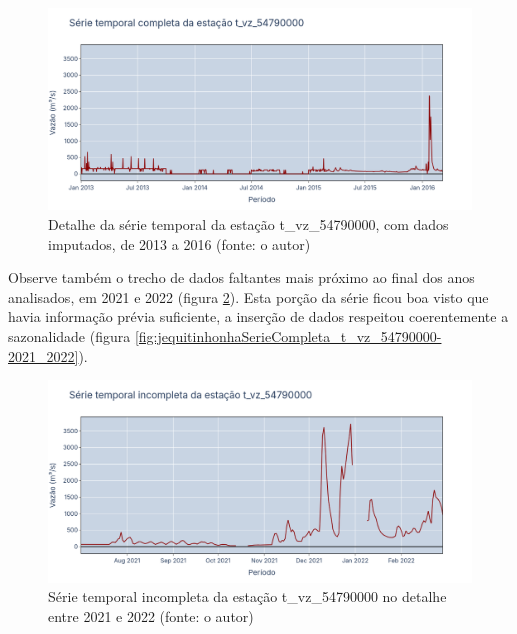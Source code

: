 \begin{figure}[!h]
	\centering
	\includegraphics[scale=0.25]{Figuras/jequiti/jequitinhonhaSerieCompleta_t_vz_54790000-2013_2016.png}
	\caption{Detalhe da série temporal da estação t\_vz\_54790000, com dados imputados, de 2013 a 2016 (fonte: o autor)}
	\label{fig:jequitinhonhaSerieCompleta_t_vz_54790000-2013_2016}
\end{figure}

Observe também o trecho de dados faltantes mais próximo ao final dos anos analisados, em 2021 e 2022 (figura \ref{fig:jequitinhonhaSerieIncompleta_t_vz_54790000-2021_2022}). Esta porção da série ficou boa visto que havia informação prévia suficiente, a inserção de dados respeitou coerentemente a sazonalidade (figura \ref{fig:jequitinhonhaSerieCompleta_t_vz_54790000-2021_2022}).

\begin{figure}[!h]
	\centering
	\includegraphics[scale=0.25]{Figuras/jequiti/jequitinhonhaSerieIncompleta_t_vz_54790000-2021_2022.png}
	\caption{Série temporal incompleta da estação t\_vz\_54790000 no detalhe entre 2021 e 2022 (fonte: o autor)}
	\label{fig:jequitinhonhaSerieIncompleta_t_vz_54790000-2021_2022}
\end{figure}


